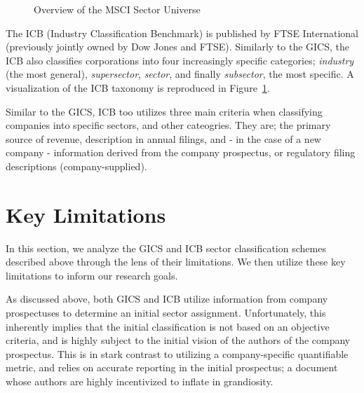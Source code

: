 \documentclass[../main.tex]{subfiles}
\begin{document}
\begin{figure}
    \centering
    \vspace{\wrapfigadjustment}
    \caption{Overview of the MSCI Sector Universe}
    \label{fig:introduction:icb_breakdown}
\end{figure}

The ICB (Industry Classification Benchmark) is published by FTSE International (previously jointly owned by Dow Jones and FTSE). Similarly to the GICS, the ICB also classifies corporations into four increasingly specific categories; \textit{industry} (the most general), \textit{supersector}, \textit{sector}, and finally \textit{subsector}, the most specific. A visualization of the ICB taxonomy is reproduced in Figure~\ref{fig:introduction:icb_breakdown}.

Similar to the GICS, ICB too utilizes three main criteria when classifying companies into specific sectors, and other cateogries. They are; the primary source of revenue, description in annual filings, and - in the case of a new company - information derived from the company prospectus, or regulatory filing descriptions (company-supplied).


\section{Key Limitations}

In this section, we analyze the GICS and ICB sector classification schemes described above through the lens of their limitations. We then utilize these key limitations to inform our research goals.

As discussed above, both GICS and ICB utilize information from company prospectuses to determine an initial sector assignment. Unfortunately, this inherently implies that the initial classification is not based on an objective criteria, and is highly subject to the initial vision of the authors of the company prospectus. This is in stark contrast to utilizing a company-specific quantifiable metric, and relies on accurate reporting in the initial prospectus; a document whose authors are highly incentivized to inflate in grandiosity.
\end{document}

